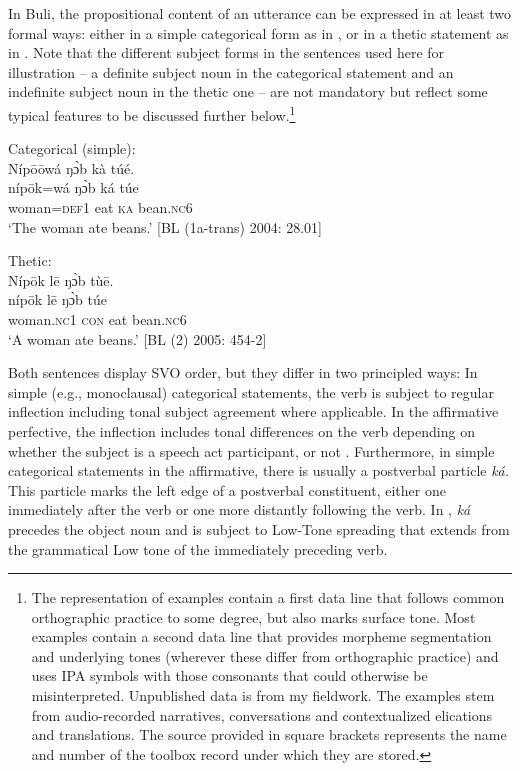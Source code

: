 \documentclass[output=paper]{langsci/langscibook}
\begin{document}
In Buli, the propositional content of an utterance can be expressed in at least two formal ways: either in a simple categorical form as in , or in a thetic statement as in . Note that the different subject forms in the sentences used here for illustration – a definite subject noun in the categorical statement and an indefinite subject noun in the thetic one – are not mandatory but reflect some typical features to be discussed further below.\footnote{The representation of examples contain a first data line that follows common orthographic practice to some degree, but also marks surface tone. Most examples contain a second data line that provides morpheme segmentation and underlying tones (wherever these differ from orthographic practice) and uses IPA symbols with those consonants that could otherwise be misinterpreted. Unpublished data is from my fieldwork. The examples stem from audio-recorded narratives, conversations and contextualized elications and translations. The source provided in square brackets represents the name and number of the toolbox record under which they are stored.} 
 
\ea\label{ex:schwarz:5}
 Categorical (simple):  \\
\glll Níp\={o}\={o}wá  ŋ\`{ɔ}b  kà  túé.\\
    \textup{níp\={o}k=wá } \textup{ŋ\`{ɔ}b}  \textup{ká} \textup{túe}\\
     woman=\textsc{def}1  eat  \textsc{ka}  bean.\textsc{nc}6\\
\glt ‘The woman ate beans.’ [BL (1a-trans) 2004: 28.01]
\z

\ea\label{ex:schwarz:6}
Thetic: \\
\glll Níp\={o}k    l\={e}  ŋ\`{ɔ}b  tù\={e}.\\
     \textup{níp\={o}k}    l\={e}  \textup{ŋ\`{ɔ}b}  \textup{túe}\\
     woman.\textsc{nc}1  \textsc{con}  eat  bean.\textsc{nc}6\\
\glt ‘A woman ate beans.’ [BL (2) 2005: 454-2]
\z

Both sentences display SVO order, but they differ in two principled ways: In simple (e.g., monoclausal) categorical statements, the verb is subject to regular inflection including tonal subject agreement where applicable. In the affirmative perfective, the inflection includes tonal differences on the verb depending on whether the subject is a speech act participant, or not \citep{Schwarz2007buli}. Furthermore, in simple categorical statements in the affirmative, there is usually a postverbal particle \textit{ká.} This particle marks the left edge of a postverbal constituent, either one immediately after the verb or one more distantly following the verb. In , \textit{ká} precedes the object noun and is subject to Low-Tone spreading that extends from the grammatical Low tone of the immediately preceding verb.
\end{document}
